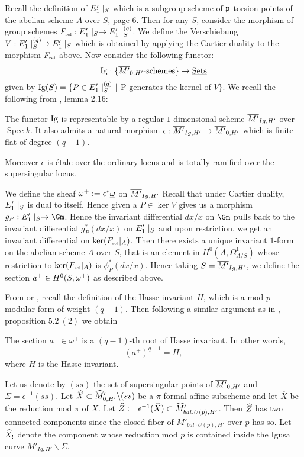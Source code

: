 \documentclass{amsart}
\newcommand{\uomega}{\underline{\omega}}
\numberwithin{equation}{section}
\def \mb{\mbox}
\DeclareMathOperator{\Spec}{\mathrm{Spec}}
\begin{document}
Recall the definition of ${E'_1}\mid_S$ which is a subgroup scheme of 
$\mathfrak{p}$-torsion points of the abelian scheme $A$ over $S$, \cite{MR2357747}
page 6.
Then for any $S$, consider the morphism of group schemes
$\Frel: \Eg \map \Eg^{(q)}$.
We define the Verschiebung $V: {E'_1}\mid_S^{(q)} \rightarrow {E'_1}\mid_S$ which is obtained by 
applying the Cartier duality to the morphism $\Frel$ above.
Now consider the following functor:
$$\Ig:  \{\oMh\mb{-schemes} \} \map \underline{\mb{Sets}}
$$
given by $\Ig(S)= \{P \in \Eg^{(q)}~ \mid~ $P$ \mb{ generates the kernel of } 
V\}$.
We recall the following from \cite{MR2357747}, lemma 2.16:

\begin{lemma}
\label{Igusalem}
The functor $\Ig$ is representable by a regular $1$-dimensional scheme 
$\overline{M'}_{Ig,H'}$ over $\Spec k$. It also admits a natural morphism 
$\epsilon: \overline{M'}_{Ig,H'} \rightarrow \overline{M'}_{0,H'}$ 
which is finite flat of degree $(q-1)$. 

Moreover $\epsilon$ is \'{e}tale over the ordinary locus and is totally 
ramified over the supersingular locus.
\end{lemma}


We define the sheaf $\pomega := \epsilon^* \uomega$ on $\overline{M'}_{Ig,H'}$
Recall that under Cartier duality, ${E'_1}\mid_S$ is dual to itself. Hence given a 
$P \in \ker V$ gives us a morphism $g_P: \Eg \map \Gm$.
Hence the invariant differential 
$dx/x$ on $\Gm$ pulls back to the invariant differential $g_P^*(dx/x)$ on
${E'_1}\mid_S$ and upon restriction, we get an invariant differential on
$\ker(\Frel|_A)$. Then there exists a unique invariant $1$-form on the abelian
scheme $A$ over $S$, that is an element in $H^0(A,\Omega^1_{A/S})$ whose
restriction to $\ker(\Frel|_A)$ is $\phi_P^*(dx/x)$. Hence taking 
$S = \overline{M'}_{Ig,H'}$, we define 
the section $a^+ \in H^0(S,\omega^+)$ as described above. 

From \cite{MR3128464} or \cite{MR2027194}, 
recall the definition of the Hasse invariant $H$, which is a mod $p$ modular 
form of weight $(q-1)$. Then following a 
similar argument as in \cite{MR1074305}, proposition $5.2~ (2)$ we obtain

\begin{lemma}
\label{root}
The
section $a^+ \in \omega^+$ is a $(q-1)$-th root of Hasse invariant. 
In other words, 
\[
(a^+)^{q-1}=H,
\]
where $H$ is the Hasse invariant.
\end{lemma}



Let us denote by $(ss)$ the set of supersingular points of $\overline{M'}_{0,H'}$ 
and  $\Sigma = \epsilon^{-1}(ss)$.
Let $\widehat{X} \subset {\widehat{M}}'_{0,H'} \backslash (ss)$ be a $\pi$-formal
 affine subscheme and let 
$\overline{X}$ be the reduction mod $\pi$ of $X$. Let 
$\widehat{Z}:= \epsilon^{-1}(\widehat{X}) \subset {\widehat{M}}'_{bal.U(p),H'}$. 
Then $\widehat{Z}$ has two connected components since the closed fiber
of $M'_{bal \cdot U(p),H'}$ over $p$ has so.
Let $\widehat{X}_!$ denote the component whose reduction mod $p$ is contained inside the Igusa curve $M'_{Ig,H'} \backslash \Sigma$.
\end{document}
